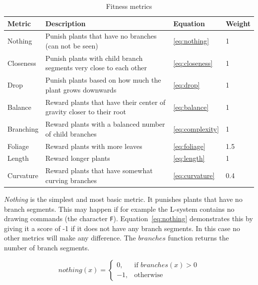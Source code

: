 \begin{table}
    \centering
    \begin{tabularx}{\textwidth}{| l | X | l | l |}
    \hline
    \textbf{Metric} & \textbf{Description} & \textbf{Equation} & \textbf{Weight} \\
    \hline
    Nothing & Punish plants that have no branches (can not be seen) & \ref{eq:nothing} & 1 \\
    \hline
    Closeness & Punish plants with child branch segments very close to each other & \ref{eq:closeness} & 1 \\
    \hline
    Drop & Punish plants based on how much the plant grows downwards & \ref{eq:drop} & 1 \\
    \hline
    Balance & Reward plants that have their center of gravity closer to their root & \ref{eq:balance} & 1 \\
    \hline
    Branching & Reward plants with a balanced number of child branches & \ref{eq:complexity} & 1 \\
    \hline
    Foliage & Reward plants with more leaves & \ref{eq:foliage} & 1.5 \\
    \hline
    Length & Reward longer plants & \ref{eq:length} & 1 \\
    \hline
    Curvature & Reward plants that have somewhat curving branches & \ref{eq:curvature} & 0.4 \\
    \hline
    \end{tabularx}
    \caption{Fitness metrics}
    \label{tab:fitness}
\end{table}

\textit{Nothing} is the simplest and most basic metric.
It punishes plants that have no branch segments.
This may happen if for example the L-system contains no drawing commands (the character \texttt{F}).
Equation~\ref{eq:nothing} demonstrates this by giving it a score of -1 if it does not have any branch segments.
In this case no other metrics will make any difference.
The $branches$ function returns the number of branch segments.

\begin{equation}
\label{eq:nothing}
    nothing(x) =
    \begin{cases}
        0,& \text{if } branches(x) > 0  \\
        -1,& \text{otherwise}
    \end{cases}
\end{equation}

